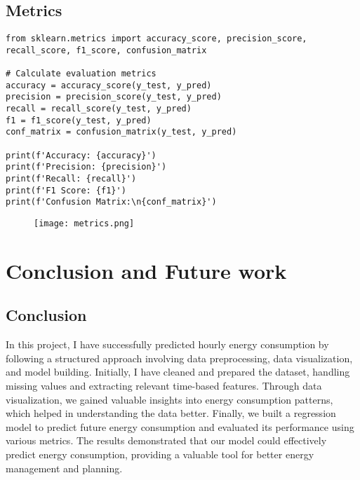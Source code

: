 \documentclass{article}
\begin{document}
\subsection{Metrics}
\begin{lstlisting}[caption={Metrics}]
from sklearn.metrics import accuracy_score, precision_score, recall_score, f1_score, confusion_matrix

# Calculate evaluation metrics
accuracy = accuracy_score(y_test, y_pred)
precision = precision_score(y_test, y_pred)
recall = recall_score(y_test, y_pred)
f1 = f1_score(y_test, y_pred)
conf_matrix = confusion_matrix(y_test, y_pred)

print(f'Accuracy: {accuracy}')
print(f'Precision: {precision}')
print(f'Recall: {recall}')
print(f'F1 Score: {f1}')
print(f'Confusion Matrix:\n{conf_matrix}')
\end{lstlisting}
\begin{figure}[H]
    \centering
    \texttt{[image: metrics.png]}
\end{figure}
\newpage
\section{Conclusion and Future work}
\subsection{Conclusion}
In this project, I have  successfully predicted hourly energy consumption by following a structured approach involving data preprocessing, data visualization, and model building. Initially, I have cleaned and prepared the dataset, handling missing values and extracting relevant time-based features. Through data visualization, we gained valuable insights into energy consumption patterns, which helped in understanding the data better. Finally, we built a regression model to predict future energy consumption and evaluated its performance using various metrics. The results demonstrated that our model could effectively predict energy consumption, providing a valuable tool for better energy management and planning.
\end{document}
